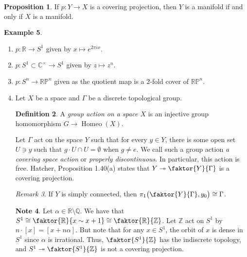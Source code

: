 \documentclass[10pt,letterpaper,cm]{nupset}
\theoremstyle{definition}
\newtheorem{definition}{Definition}[subsection]
\newtheorem{exmp}[definition]{Example}
\newtheorem{note}[definition]{Note}
\theoremstyle{theorem}
\newtheorem{prop}[definition]{Proposition}
\theoremstyle{remark}
\newtheorem{remark}[definition]{Remark}
\newcommand{\C}{\mathbb C}
\newcommand{\Q}{\mathbb Q}
\newcommand{\R}{\mathbb{R}}
\newcommand{\RP}{\mathbb{RP}}
\newcommand{\Z}{\mathbb Z}
\newcommand{\1}{\mathbb{1}}
\newcommand{\0}{\vec 0}
\DeclareMathOperator{\homeo}{Homeo}
\begin{document}
\begin{prop}
If $p: Y \to X$ is a covering projection, then $Y$ is a manifold if and only if $X$ is a manifold. 
\end{prop}

\begin{exmp} $ $
\begin{enumerate}
\item $p : \R \to S^1$ given by $x \mapsto e^{2\pi ix}$.
\item $p: S^1\subset \C^{\times} \to S^1$ given by $z \mapsto z^n$.
\item $p: S^n \to \RP^n$ given as the quotient map is a $2$-fold cover of $\RP^n$.
\item Let $X$ be a space and $\Gamma$ be a discrete topological group. 
\begin{definition}
A \textit{group action on a space $X$} is an injective group homomorphism $G \to \homeo(X)$.
\end{definition}
Let $\Gamma$ act on the space $Y$ such that for every $y\in Y$, there is some open set $U\ni y$ such that $g\cdot U \cap U =\emptyset$ when $g\ne e$. We call such a group action \textit{a covering space action} or \textit{properly discontinuous}. In particular, this action is free.  Hatcher, Proposition 1.40(a) states that $Y \twoheadrightarrow \faktor{Y}{\Gamma}$ is a covering projection.
\begin{remark}
If $Y$ is simply connected, then $\pi_1 \big (\faktor{Y}{\Gamma} , y_0 \big) \cong \Gamma$.
\end{remark}
\begin{note}
Let $\alpha \in \R\setminus \Q$. We have that $S^1 \cong \faktor{\R}{x\sim x+1} \cong \faktor{\R}{\Z}$. Let $\Z$ act on $S^1$ by $n\cdot [x] = [x + n \alpha]$. But note that for any $x\in S^1$, the orbit of $x$ is dense in $S^1$ since $\alpha$ is irrational. Thus, $\faktor{S^1}{\Z}$ has the indiscrete topology, and $S^1 \twoheadrightarrow \faktor{S^1}{\Z}$ is not a covering projection.
\end{note}
\end{enumerate}
\end{exmp}
\end{document}
